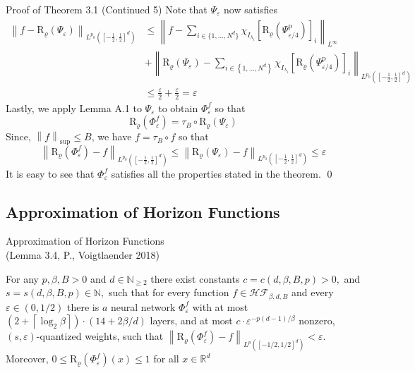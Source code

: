 \documentclass{if-beamer}
\newcommand{\norm}[2]{\left\lVert#1\right\rVert_{#2}}
\begin{document}
\begin{frame}{Proof of Theorem 3.1 (Continued 5)}
    Note that $\Psi_{\varepsilon}$ now satisfies 
    {\small
    \begin{align*}
        \left\|f - \mathrm{R}_{\varrho}\left(\Psi_{\varepsilon}\right)\right\|_{L^{p_{0}}([-\frac{1}{2}, \frac{1}{2}]^d)} &\leq
         \norm{f-\sum_{i \in\{1, \ldots, N^{d}\}} \chi_{I_{\lambda_{i}}}\left[\mathrm{R}_{\varrho}\left(\Psi_{\varepsilon / 4}^{\mathrm{p}}\right)\right]_{i}}{L^{\infty}}\\
         &+ \left\|\mathrm{R}_{\varrho}\left(\Psi_{\varepsilon}\right)-\sum_{i \in\left\{1, \ldots, N^{d}\right\}} \chi_{I_{\lambda_{i}}}\left[\mathrm{R}_{\varrho}\left(\Psi_{\varepsilon / 4}^{\mathrm{p}}\right)\right]_{i}\right\|_{L^{p_{0}}([-\frac{1}{2}, \frac{1}{2}]^d)} \\
         &\leq \frac{\varepsilon}{2} + \frac{\varepsilon}{2} = \varepsilon
    \end{align*}
    }%
    Lastly, we apply Lemma A.1 to $\Psi_{\varepsilon}$ to obtain $\Phi_{\varepsilon}^f$ so that $$\mathrm{R}_{\varrho}(\Phi_{\varepsilon}^f) = \tau_B \circ \mathrm{R}_{\varrho}(\Psi_{\varepsilon}) $$
    Since, $\norm{f}{\sup} \leq B$, we have $f = \tau_B \circ f$ so that $$\norm{\mathrm{R}_{\varrho}(\Phi_{\varepsilon}^f) - f}{L^{p_0}([-\frac{1}{2}, \frac{1}{2}]^d)} \leq  \norm{\mathrm{R}_{\varrho}(\Psi_{\varepsilon}) - f}{L^{p_0}([-\frac{1}{2}, \frac{1}{2}]^d)} \leq \varepsilon$$
    It is easy to see that $\Phi_{\varepsilon}^f$ satisfies all the properties stated in the theorem. \qed
\end{frame}

\subsection{Approximation of Horizon Functions}
\begin{frame}{Approximation of Horizon Functions \\ (Lemma 3.4, P., Voigtlaender 2018)}
    \begin{tcolorbox}
        For any $p, \beta, B>0$ and $d \in \mathbb{N}_{\geq 2}$ there exist constants $c=c(d, \beta, B, p)>0,$ and $s=s(d, \beta, B, p) \in \mathbb{N},$ such that for every function $f \in \mathcal{H} \mathcal{F}_{\beta, d, B}$ and every $\varepsilon \in(0,1 / 2)$ there is $a$ neural network $\Phi_{\varepsilon}^{f}$ with at most $\left(2+\left\lceil\log _{2} \beta\right\rceil\right) \cdot(14+2 \beta / d)$ layers, and at most $c \cdot \varepsilon^{-p(d-1) / \beta}$ nonzero,
        $(s, \varepsilon)$-quantized weights, such that $\left\|\mathrm{R}_{\varrho}\left(\Phi_{\varepsilon}^{f}\right)-f\right\|_{L^{p}\left([-1 / 2,1 / 2]^{d}\right)}<\varepsilon .$ Moreover, $0 \leq \mathrm{R}_{\varrho}\left(\Phi_{\varepsilon}^{f}\right)(x) \leq 1$ for all
        $x \in \mathbb{R}^{d}$    
    \end{tcolorbox}
\end{frame}
\end{document}
